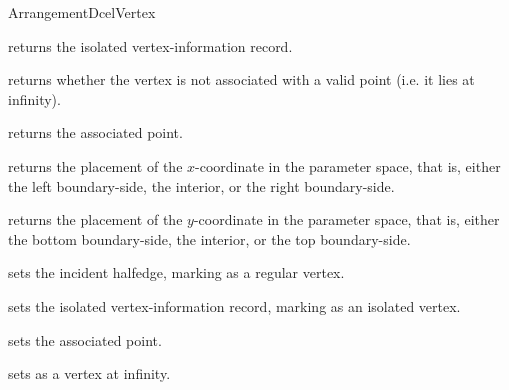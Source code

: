 \begin{ccRefConcept}{ArrangementDcelVertex}
{
    {returns the isolated vertex-information record.
     }

    {returns whether the vertex is not associated with a valid point (i.e. it
     lies at infinity).}

    {returns the associated point.
     }

    {returns the placement of the $x$-coordinate in the parameter space,
    that is, either the left boundary-side, the interior, or the right
    boundary-side.}

    {returns the placement of the $y$-coordinate in the parameter space,
    that is, either the bottom boundary-side, the interior, or the top
    boundary-side.}

\ccModifiers

    {sets the incident halfedge, marking \ccVar{} as a regular vertex.}

    {sets the isolated vertex-information record, marking \ccVar{}
     as an isolated vertex.}

    {sets the associated point.}

    {sets \ccVar{} as a vertex at infinity.
     }

} %

\ccSeeAlso

\\
\\

\end{ccRefConcept}  

\ccRefPageEnd

